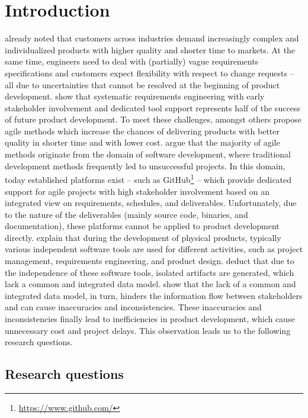\section{Introduction}
\label{sec:introduction}

\cite{Ahti2005} already noted that customers across industries demand increasingly complex and individualized products with higher quality and shorter time to markets.
At the same time, engineers need to deal with (partially) vague requirements specifications and customers expect flexibility with respect to change requests -- all due to uncertainties that cannot be resolved at the beginning of product development.
\cite{6226784} show that systematic requirements engineering with early stakeholder involvement and dedicated tool support represents half of the success of future product development.
To meet these challenges, amongst others \cite{ozkan2019agile} propose agile methods which increase the chances of delivering products with better quality in shorter time and with lower cost. 
\cite{HEIMICKE2021786} argue that the majority of agile methods originate from the domain of software development, where traditional development methods frequently led to unsuccessful projects.
In this domain, today established platforms exist -- such as GitHub\footnote{\url{https://www.github.com/}} -- which provide dedicated support for agile projects with high stakeholder involvement based on an integrated view on requirements, schedules, and deliverables.
Unfortunately, due to the nature of the deliverables (mainly source code, binaries, and documentation), these platforms cannot be applied to product development directly. 
\cite{MarionTucker} explain that during the development of physical products, typically various independent software tools are used for different activities, such as project management, requirements engineering, and product design.
\cite{houshmand2010collaborative} deduct that due to the independence of these software tools, isolated artifacts are generated, which lack a common and integrated data model.
\cite{Jorma2014} show that the lack of a common and integrated data model, in turn, hinders the information flow between stakeholders and can cause inaccuracies and inconsistencies.
These inaccuracies and inconsistencies finally lead to inefficiencies in product development, which cause unnecessary cost and project delays.
This observation leads us to the following research questions.

\subsection{Research questions}

